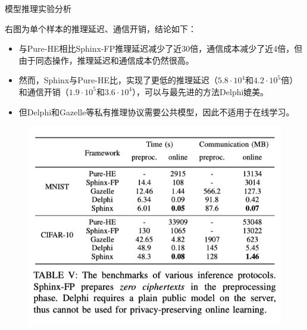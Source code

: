 \documentclass{beamer}
\begin{document}
\begin{frame}{模型推理实验分析}
\begin{minipage}[l]{0.6\linewidth}
右图为单个样本的推理延迟、通信开销，结论如下：
\begin{itemize}
	\item {\footnotesize 与Pure-HE相比Sphinx-FP推理延迟减少了近30倍，通信成本减少了近4倍，但由于同态操作，推理延迟和通信成本仍然很高。}
	\item {\footnotesize 然而，Sphinx与Pure-HE比，实现了更低的推理延迟（$5.8\cdot10^4$和$4.2\cdot10^5$倍）和通信开销（$1.9\cdot10^5$和$3.6\cdot10^4$），可以与最先进的方法Delphi媲美。}
	\item {\footnotesize 但Delphi和Gazelle等私有推理协议需要公共模型，因此不适用于在线学习。}
\end{itemize}
\end{minipage}
\begin{minipage}[l]{0.3\linewidth}
    \begin{figure}[h]
            \centering
             \hspace{2cm}
            \includegraphics[height=.5\textheight]{pic/table5.png}
        \end{figure} 
\end{minipage}
\end{frame}



\end{document}
